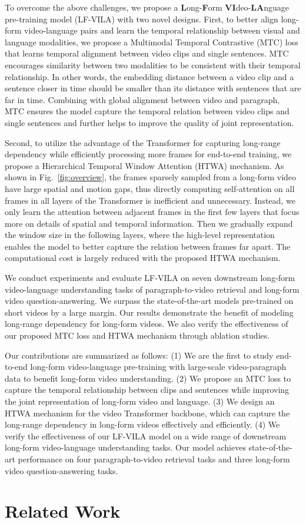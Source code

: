 \documentclass{article}
\begin{document}
To overcome the above challenges, we propose a \textbf{L}ong-\textbf{F}orm \textbf{VI}deo-\textbf{LA}nguage pre-training model (LF-VILA) with two novel designs.
First, to better align long-form video-language pairs and learn the temporal relationship between visual and language modalities, we propose a Multimodal Temporal Contrastive (MTC) loss that learns temporal alignment between video clips and single sentences. MTC encourages similarity between two modalities to be consistent with their temporal relationship. In other words, the embedding distance between a video clip and a sentence closer in time should be smaller than its distance with sentences that are far in time. Combining with global alignment between video and paragraph, MTC ensures the model capture the temporal relation between video clips and single sentences and further helps to improve the quality of joint representation. 

Second, to utilize the advantage of the Transformer for capturing long-range dependency while efficiently processing more frames for end-to-end training, we propose a Hierarchical Temporal Window Attention (HTWA) mechanism.
As shown in Fig.~\ref{fig:overview}, the frames sparsely sampled from a long-form video have large spatial and motion gaps, thus directly computing self-attention on all frames in all layers of the Transformer is inefficient and unnecessary.
Instead, we only learn the attention between adjacent frames in the first few layers that focus more on details of spatial and temporal information.
Then we gradually expand the window size in the following layers, where the high-level representation enables the model to better capture the relation between frames far apart. The computational cost is largely reduced with the proposed HTWA mechanism.

We conduct experiments and evaluate LF-VILA on seven downstream long-form video-language understanding tasks of paragraph-to-video retrieval and long-form video question-answering. We surpass the state-of-the-art models pre-trained on short videos by a large margin. Our results demonstrate the benefit of modeling long-range dependency for long-form videos. We also verify the effectiveness of our proposed MTC loss and HTWA mechanism through ablation studies.

Our contributions are summarized as follows:
(1) We are the first to study end-to-end long-form video-language pre-training with large-scale video-paragraph data to benefit long-form video understanding. 
(2) We propose an MTC loss to capture the temporal relationship between clips and sentences while improving the joint representation of long-form video and language.
(3) We design an HTWA mechanism for the video Transformer backbone, which can capture the long-range dependency in long-form videos effectively and efficiently.
(4) We verify the effectiveness of our LF-VILA model on a wide range of downstream long-form video-language understanding tasks. Our model achieves state-of-the-art performance on four paragraph-to-video retrieval tasks and three long-form video question-answering tasks. \section{Related Work}
\label{work}
\end{document}
